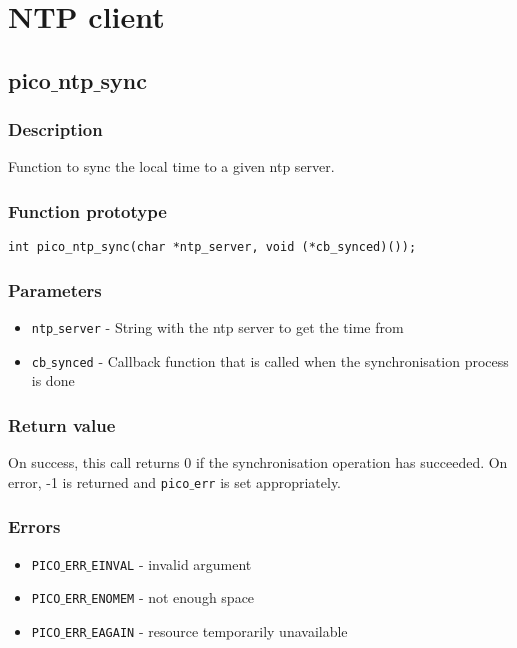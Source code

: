 \section{NTP client}



\subsection{pico$\_$ntp$\_$sync}

\subsubsection*{Description}
Function to sync the local time to a given ntp server.
\subsubsection*{Function prototype}
\begin{verbatim}
int pico_ntp_sync(char *ntp_server, void (*cb_synced)());
\end{verbatim}

\subsubsection*{Parameters}
\begin{itemize}[noitemsep]
\item \texttt{ntp$\_$server} - String with the ntp server to get the time from
\item \texttt{cb$\_$synced} - Callback function that is called when the synchronisation process is done
\end{itemize}

\subsubsection*{Return value}
On success, this call returns 0 if the synchronisation operation has succeeded.
On error, -1 is returned and \texttt{pico$\_$err} is set appropriately.

\subsubsection*{Errors}
\begin{itemize}[noitemsep]
\item \texttt{PICO$\_$ERR$\_$EINVAL} - invalid argument
\item \texttt{PICO$\_$ERR$\_$ENOMEM} - not enough space
\item \texttt{PICO$\_$ERR$\_$EAGAIN} - resource temporarily unavailable
\end{itemize}

